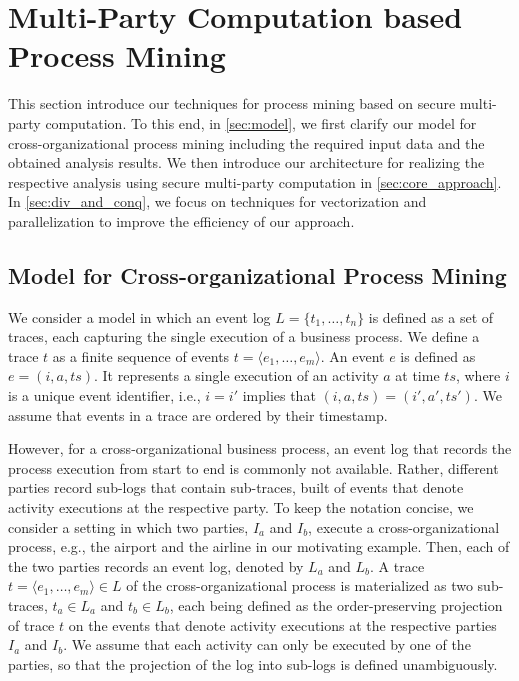 \section{Multi-Party Computation based Process Mining}
\label{sec:approach}
This section introduce our techniques for process mining based on 
secure multi-party computation. To this end, in \autoref{sec:model}, we first 
clarify our model for cross-organizational process mining including the 
required input data and the obtained analysis results. We then introduce our 
architecture for realizing the respective analysis using secure multi-party 
computation in \autoref{sec:core_approach}. In 
\autoref{sec:div_and_conq}, we focus on techniques for vectorization and 
parallelization to improve the efficiency of our approach.

\subsection{Model for Cross-organizational Process Mining}
\label{sec:model}

We consider a model in which an event log $L=\{t_1,\ldots,t_n\}$ is defined as 
a set of traces, each capturing the single execution of a business 
process. We define a trace $t$ as a finite sequence of events $t=\langle 
e_1,\ldots,e_m \rangle$. An event $e$ is defined as $e=(i,a,ts)$. It represents 
a single execution of an activity $a$ at time $ts$, where $i$ is 
a unique event identifier, i.e., $i = i'$ implies that $(i,a,ts) = 
(i',a',ts')$. We assume that events in a trace are ordered by their timestamp. 

However, for a cross-organizational business process, an event log that records 
the process execution from start to end is commonly not available. Rather, 
different parties record sub-logs that contain sub-traces, built of events that 
denote activity executions at the respective party. To keep the notation 
concise, we consider a setting in which two parties, $I_a$ and $I_b$, execute a 
cross-organizational process, e.g., the airport and the airline in our 
motivating example. Then, each of the two parties records an event log, denoted 
by $L_a$ and $L_b$. A trace $t=\langle 
e_1,\ldots,e_m \rangle\in L$ of the cross-organizational process is 
materialized as two sub-traces, $t_a \in L_a$ and $t_b \in L_b$, each being 
defined as the order-preserving projection of trace $t$ on the events that 
denote activity executions at the respective parties $I_a$ and $I_b$. We assume 
that each activity can only be executed by one of the parties, so that the 
projection of the log into sub-logs is defined unambiguously. 

